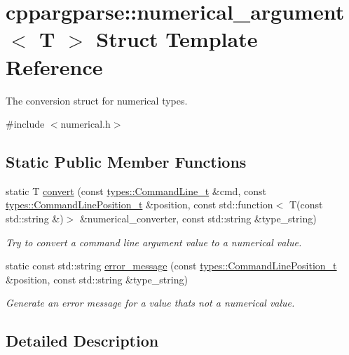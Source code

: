 \hypertarget{structcppargparse_1_1numerical__argument}{}\section{cppargparse\+:\+:numerical\+\_\+argument$<$ T $>$ Struct Template Reference}
\label{structcppargparse_1_1numerical__argument}


The conversion struct for numerical types.  




{\ttfamily \#include $<$numerical.\+h$>$}

\subsection*{Static Public Member Functions}
\begin{DoxyCompactItemize}
\item 
static T \hyperlink{structcppargparse_1_1numerical__argument_ab775dbbfc851bbd9052b70dfdf0dbb77}{convert} (const \hyperlink{types_8h_a80adf2418b7ce9fe616698efa7533ecf}{types\+::\+Command\+Line\+\_\+t} \&cmd, const \hyperlink{types_8h_a43b4f43f8940de1bf09ced6f1b668053}{types\+::\+Command\+Line\+Position\+\_\+t} \&position, const std\+::function$<$ T(const std\+::string \&)$>$ \&numerical\+\_\+converter, const std\+::string \&type\+\_\+string)
\begin{DoxyCompactList}\small\item\em Try to convert a command line argument value to a numerical value. \end{DoxyCompactList}\item 
static const std\+::string \hyperlink{structcppargparse_1_1numerical__argument_a05ead3c772c43a02b6608ef2b2382fb8}{error\+\_\+message} (const \hyperlink{types_8h_a43b4f43f8940de1bf09ced6f1b668053}{types\+::\+Command\+Line\+Position\+\_\+t} \&position, const std\+::string \&type\+\_\+string)
\begin{DoxyCompactList}\small\item\em Generate an error message for a value that\textquotesingle{}s not a numerical value. \end{DoxyCompactList}\end{DoxyCompactItemize}


\subsection{Detailed Description}
